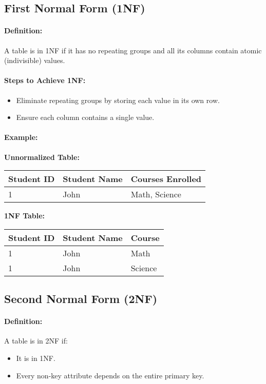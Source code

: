 \documentclass{article}
\begin{document}
\subsection{First Normal Form (1NF)}
\paragraph{Definition:}
A table is in 1NF if it has no repeating groups and all its columns contain atomic (indivisible) values.

\paragraph{Steps to Achieve 1NF:}
\begin{itemize}
    \item Eliminate repeating groups by storing each value in its own row.
    \item Ensure each column contains a single value.
\end{itemize}

\paragraph{Example:}
\textbf{Unnormalized Table:}
\begin{center}
\begin{tabular}{|l|l|l|}
\hline
Student ID & Student Name & Courses Enrolled \\ \hline
1 & John & Math, Science \\ \hline
\end{tabular}
\end{center}

\textbf{1NF Table:}
\begin{tabular}{|l|l|l|}
\hline
Student ID & Student Name & Course \\ \hline
1 & John & Math \\ \hline
1 & John & Science \\ \hline
\end{tabular}

\subsection{Second Normal Form (2NF)}
\paragraph{Definition:}
A table is in 2NF if:
\begin{itemize}
    \item It is in 1NF.
    \item Every non-key attribute depends on the entire primary key.
\end{itemize}
\end{document}
